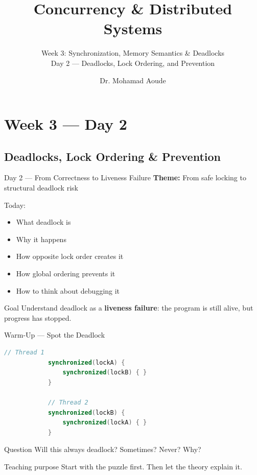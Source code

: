 \documentclass[aspectratio=169,11pt]{beamer}
\title{Concurrency \& Distributed Systems}
\subtitle{Week 3: Synchronization, Memory Semantics \& Deadlocks\\Day 2 --- Deadlocks, Lock Ordering, and Prevention}
\author{Dr. Mohamad Aoude}
\institute{Lebanese University \\ Faculty of Engineering}
\date{}
\begin{document}
	
	\begin{frame}
		\titlepage
	\end{frame}
	
	\section{Week 3 --- Day 2}
	\subsection{Deadlocks, Lock Ordering \& Prevention}
	
	\begin{frame}{Day 2 --- From Correctness to Liveness Failure}
		\textbf{Theme:} From safe locking to structural deadlock risk
		
		\bigskip
		
		Today:
		\begin{itemize}
			\item What deadlock is
			\item Why it happens
			\item How opposite lock order creates it
			\item How global ordering prevents it
			\item How to think about debugging it
		\end{itemize}
		
		\bigskip
		\begin{block}{Goal}
			Understand deadlock as a \textbf{liveness failure}: the program is still alive,
			but progress has stopped.
		\end{block}
	\end{frame}
	
	\begin{frame}[fragile]{Warm-Up --- Spot the Deadlock}
		\begin{lstlisting}[language=Java]
			// Thread 1
			synchronized(lockA) {
				synchronized(lockB) { }
			}
			
			// Thread 2
			synchronized(lockB) {
				synchronized(lockA) { }
			}
		\end{lstlisting}
		
		\vspace{0.2cm}
		\begin{alertblock}{Question}
			Will this always deadlock? Sometimes? Never? Why?
		\end{alertblock}
		
		\begin{block}{Teaching purpose}
			Start with the puzzle first.  
			Then let the theory explain it.
		\end{block}
	\end{frame}
	
\end{document}
